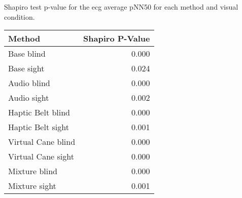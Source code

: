 
\centering
\caption{Shapiro test p-value for the ecg average pNN50 for each method and visual condition.}
\label{tab:shapiro_ecg_pnn50}
\begin{tabular}{lr}
\toprule
            Method &  Shapiro P-Value \\
\midrule
        Base blind &            0.000 \\
        Base sight &            0.024 \\
       Audio blind &            0.000 \\
       Audio sight &            0.002 \\
 Haptic Belt blind &            0.000 \\
 Haptic Belt sight &            0.001 \\
Virtual Cane blind &            0.000 \\
Virtual Cane sight &            0.000 \\
     Mixture blind &            0.000 \\
     Mixture sight &            0.001 \\
\bottomrule
\end{tabular}

